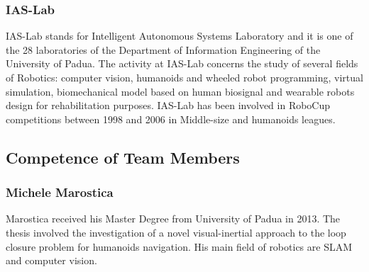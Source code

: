 \documentclass[conference]{IEEEtran}
\begin{document}

\subsubsection{IAS-Lab} IAS-Lab stands for Intelligent Autonomous Systems Laboratory and it is one of the 28 laboratories of the Department of Information Engineering of the University of Padua.
The activity at IAS-Lab concerns the study of several fields of Robotics: computer vision, humanoids and wheeled robot programming, virtual simulation, biomechanical model based on human biosignal and wearable robots design for rehabilitation purposes. IAS-Lab has been involved in RoboCup competitions between 1998 and 2006 in Middle-size and humanoids leagues.\\

\subsection{Competence of Team Members}

\subsubsection*{Michele Marostica}
Marostica received his Master Degree from University of Padua in 2013. The thesis involved the investigation of a novel visual-inertial approach to the loop closure problem for humanoids navigation. His main field of robotics are SLAM and computer vision.
\end{document}

